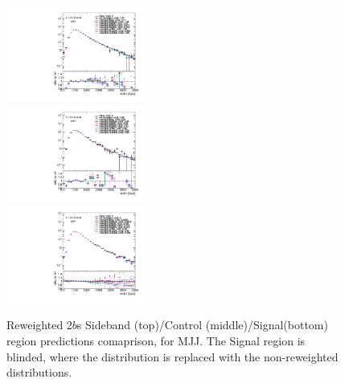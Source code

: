 \begin{figure}[htbp!]
\begin{center}
\includegraphics[width=0.4\textwidth,angle=-90]{figures/boosted/AppendixReweight/Compare/Data_TwoTag_split_Sideband_directcompare_mHH_l_1.pdf}\\
\includegraphics[width=0.4\textwidth,angle=-90]{figures/boosted/AppendixReweight/Compare/Data_TwoTag_split_Control_directcompare_mHH_l_1.pdf}\\
\includegraphics[width=0.4\textwidth,angle=-90]{figures/boosted/AppendixReweight/Compare/Data_TwoTag_split_Signal_directcompare_mHH_l_1.pdf}
\caption{Reweighted 2$b$s Sideband (top)/Control (middle)/Signal(bottom) region predictions comaprison, for MJJ. The Signal region is blinded, where the distribution is replaced with the non-reweighted distributions.}
\label{fig:app-rw-comp-2bs}
\end{center}
\end{figure}

